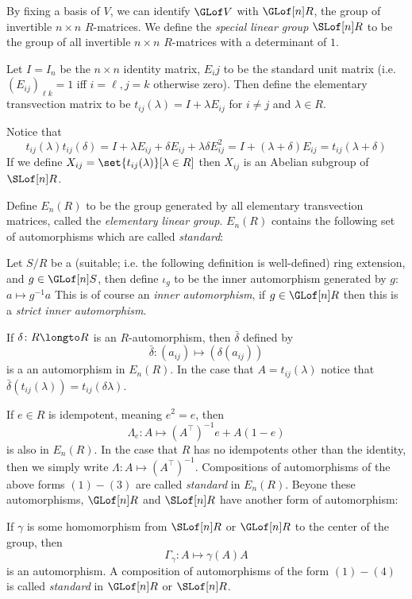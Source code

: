 By fixing a basis of $V$, we can identify $\GLof V$ with $\GLof[n]R$, the group of invertible $n\times n$ $R$-matrices.
We define the {\it special linear group} $\SLof[n]R$ to be the group of all invertible $n\times n$ $R$-matrices with a determinant of $1$.

\bdefn

    Let $I=I_n$ be the $n\times n$ identity matrix, $E_ij$ to be the standard unit matrix (i.e. $(E_{ij})_{\ell k}=1$ iff $i=\ell,j=k$ otherwise zero).
    Then define the {\emphcolor elementary transvection matrix} to be $t_{ij}(\lambda)=I+\lambda E_{ij}$ for $i\neq j$ and $\lambda\in R$.

\edefn

Notice that
$$ t_{ij}(\lambda)t_{ij}(\delta) = I + \lambda E_{ij} + \delta E_{ij} + \lambda\delta E_{ij}^2 = I + (\lambda+\delta)E_{ij} = t_{ij}(\lambda+\delta) $$
If we define $X_{ij}=\set{t_{ij}(\lambda)}[\lambda\in R]$ then $X_{ij}$ is an Abelian subgroup of $\SLof[n]R$.

Define $E_n(R)$ to be the group generated by all elementary transvection matrices, called the {\it elementary linear group}.
$E_n(R)$ contains the following set of automorphisms which are called {\it standard}:

\benum
    \item Let $S/R$ be a (suitable; i.e. the following definition is well-defined) ring extension, and $g\in\GLof[n]S$, then define $\iota_g$ to be the inner automorphism generated by $g$: $a\mapsto g^{-1}a$
    This is of course an {\it inner automorphism}, if $g\in\GLof[n]R$ then this is a {\it strict inner automorphism}.
    \item If $\delta\colon R\longto R$ is an $R$-automorphism, then $\bar\delta$ defined by
    $$ \bar\delta\colon (a_{ij})\mapsto(\delta(a_{ij})) $$
    is a an automorphism in $E_n(R)$.
    In the case that $A=t_{ij}(\lambda)$ notice that $\bar\delta(t_{ij}(\lambda))=t_{ij}(\delta\lambda)$.
    \item If $e\in R$ is idempotent, meaning $e^2=e$, then
    $$ \Lambda_e\colon A\mapsto (A^\top)^{-1}e+A(1-e) $$
    is also in $E_n(R)$.
    In the case that $R$ has no idempotents other than the identity, then we simply write $\Lambda\colon A\mapsto (A^\top)^{-1}$.
    \middletext Compositions of automorphisms of the above forms $(1)-(3)$ are called {\it standard} in $E_n(R)$.
    Beyone these automorphisms, $\GLof[n]R$ and $\SLof[n]R$ have another form of automorphism:
    \item If $\gamma$ is some homomorphism from $\SLof[n]R$ or $\GLof[n]R$ to the center of the group, then
    $$ \Gamma_\gamma\colon A\mapsto\gamma(A)A $$
    is an automorphism.
    \middletext A composition of automorphisms of the form $(1)-(4)$ is called {\it standard} in $\GLof[n]R$ or $\SLof[n]R$.
\eenum

